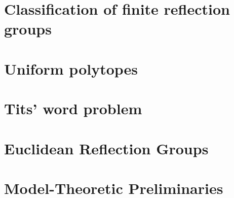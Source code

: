 \documentclass[a4paper,11pt, titlepage]{article}
\begin{document}
\section{Classification of finite reflection groups}\label{section:classification}


\section{Uniform polytopes}\label{section:uniform}


\section{Tits' word problem}\label{section:word}


\section{Euclidean Reflection Groups}\label{section:euclidean}


\appendix
\section{Model-Theoretic Preliminaries}\label{appendix:model}



\end{document}
